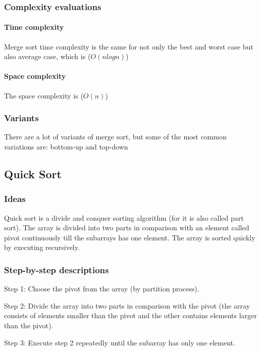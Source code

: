 \documentclass{article}
\newcommand\tab[1][0.5cm]{\hspace*{#1}}
\begin{document}
\subsubsection{Complexity evaluations}

\paragraph{\tab Time complexity}
Merge sort time complexity is the same for not only the best and worst case but also average case, which is ($O(nlogn)$)

\paragraph{\tab Space complexity}
The space complexity is ($O(n)$)
\subsubsection{Variants}
There are a lot of variants of merge sort, but some of the most common variations are: bottom-up and top-down
\pagebreak

\subsection{Quick Sort}

\subsubsection{Ideas}

\tab Quick sort is a divide and conquer sorting algorithm (for it is also called part sort). The array is divided into two parts in comparison with an element called pivot continuously till the subarrays has one element. The array is sorted quickly by executing recursively.

\subsubsection{Step-by-step descriptions}

\tab Step 1: Choose the pivot from the array (by partition process).
\smallskip

Step 2: Divide the array into two parts in comparison with the pivot (the array consists of elements smaller than the pivot and the other contains elements larger than the pivot).
\smallskip

Step 3: Execute step 2 repeatedly until the subarray has only one element.
\smallskip
\end{document}
